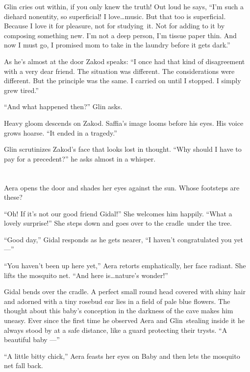 \documentclass[twoside,11pt,openany]{book}
\begin{document}
Glin cries out within, if you only knew the truth! Out loud he says, ``I'm such a diehard nonentity, so
superficial! I love{\ldots}music. But that too is superficial. Because I love it for pleasure, not for studying~it. Not
for adding to it by composing something new. I'm not a deep person, I'm tissue paper thin. And now I must go, I
promised mom to take in the laundry before it gets dark.''

As he's almost at the door Zakod speaks: ``I once had that kind of disagreement with a very dear friend.
The situation was different. The considerations were different. But the principle was the same. I carried on until I
stopped. I simply{ }grew tired.''

``And what happened then?'' Glin asks.

Heavy gloom descends on Zakod.  Saffia's image looms before his eyes. His voice grows hoarse. ``It ended
in a tragedy.''

Glin scrutinizes Zakod's face that looks lost in thought. ``Why
should{ }I have to pay for a precedent?'' he asks almost in a
whisper.



\chapter{}

Aera opens the door and shades her eyes against the sun. Whose footsteps are these?

``Oh! If it's not our good friend Gidal!'' She welcomes him happily. ``What a
lovely surprise!'' She steps down and goes over to the
cradle~under{ }the tree.

``Good day,'' Gidal responds as he gets nearer, ``I haven't congratulated you yet
---''

``You haven't been up here yet,'' Aera retorts emphatically, her face radiant. She lifts the
mosquito net. ``And here is{\ldots}nature's wonder!''

Gidal bends over the cradle. A perfect small round head covered with shiny hair and adorned with a tiny rosebud ear lies
in a field of pale blue flowers. The thought about this baby's conception in the darkness of the cave makes him
uneasy. Ever since the first time he observed Aera and Glin~stealing inside it he always stood by at a safe distance,
like a guard protecting their trysts. ``A beautiful baby ---''

``A little bitty chick,'' Aera feasts her eyes on Baby and then lets the mosquito net fall
back.
\end{document}

